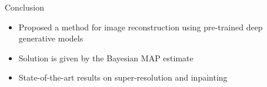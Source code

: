 \begin{frame}{Conclusion}
 
 \begin{itemize}
  \item Proposed a method for image reconstruction using pre-trained deep generative models
  
  \vt
  
  \item Solution is given by the Bayesian MAP estimate
  
  \vt
  
  \item State-of-the-art results on super-resolution and inpainting
  
 \end{itemize}

 
\end{frame}




